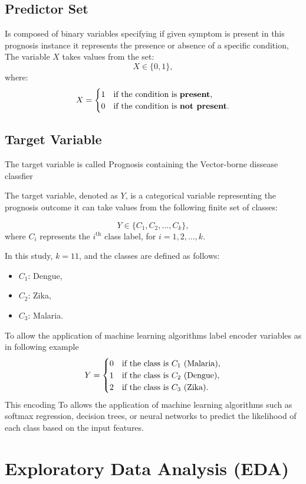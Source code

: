 \documentclass{article}
\begin{document}
\subsection{Predictor Set}
Is composed of binary variables specifying if given symptom is present 
in this prognosis instance it represents the presence or absence of a specific condition, The variable \( X \) takes values from the set:
\[
X \in \{0, 1\},
\]
where:
\[
X =
\begin{cases}
1 & \text{if the condition is \textbf{present}}, \\
0 & \text{if the condition is \textbf{not present}}.
\end{cases}
\]

\subsection{Target Variable}
The target variable is called Prognosis containing the Vector-borne dissease classfier

The target variable, denoted as \( Y \), is a categorical variable representing the prognosis outcome it can take values from the following finite set of classes:

\[
Y \in \{ C_1, C_2, \dots, C_k \},
\] 
where \( C_i \) represents the \( i^{\text{th}} \) class label, for \( i = 1, 2, \dots, k \).

In this study, \( k = 11 \), and the classes are defined as follows:
\begin{itemize}
    \item \( C_1 \): Dengue,
    \item \( C_2 \): Zika,
    \item \( C_3 \): Malaria.
\end{itemize}
To allow the application of machine learning algorithms label encoder variables as in following example
\[
Y = 
\begin{cases} 
0 & \text{if the class is \( C_1 \) (Malaria)}, \\
1 & \text{if the class is \( C_2 \) (Dengue)}, \\
2 & \text{if the class is \( C_3 \) (Zika)}.
\end{cases}
\]
This encoding To allows the application of machine learning algorithms such as softmax regression, decision trees, or neural networks to predict the likelihood of each class based on the input features.

\section{Exploratory Data Analysis (EDA)}
\end{document}
